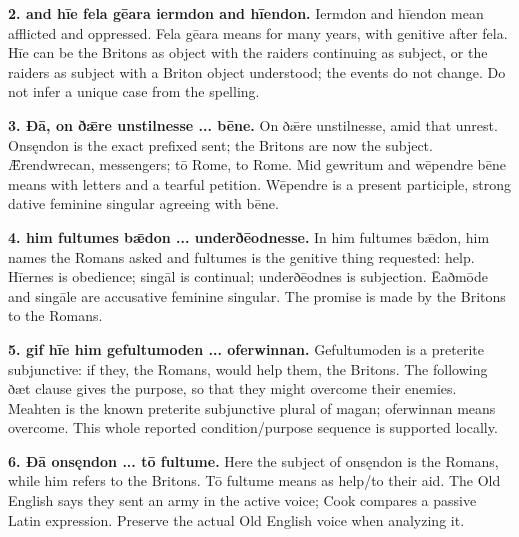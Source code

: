 \textbf{2. and hīe fela gēara iermdon and hīendon.} Iermdon and hīendon mean afflicted and oppressed. Fela gēara means for many years, with genitive after fela. Hīe can be the Britons as object with the raiders continuing as subject, or the raiders as subject with a Briton object understood; the events do not change. Do not infer a unique case from the spelling.

\textbf{3. Ðā, on ðǣre unstilnesse ... bēne.} On ðǣre unstilnesse, amid that unrest. Onsęndon is the exact prefixed sent; the Britons are now the subject. Ǣrendwrecan, messengers; tō Rome, to Rome. Mid gewritum and wēpendre bēne means with letters and a tearful petition. Wēpendre is a present participle, strong dative feminine singular agreeing with bēne.

\textbf{4. him fultumes bǣdon ... underðēodnesse.} In him fultumes bǣdon, him names the Romans asked and fultumes is the genitive thing requested: help. Hīernes is obedience; singāl is continual; underðēodnes is subjection. Ēaðmōde and singāle are accusative feminine singular. The promise is made by the Britons to the Romans.

\textbf{5. gif hīe him gefultumoden ... oferwinnan.} Gefultumoden is a preterite subjunctive: if they, the Romans, would help them, the Britons. The following ðæt clause gives the purpose, so that they might overcome their enemies. Meahten is the known preterite subjunctive plural of magan; oferwinnan means overcome. This whole reported condition/\allowbreak{}purpose sequence is supported locally.

\textbf{6. Ðā onsęndon ... tō fultume.} Here the subject of onsęndon is the Romans, while him refers to the Britons. Tō fultume means as help/\allowbreak{}to their aid. The Old English says they sent an army in the active voice; Cook compares a passive Latin expression. Preserve the actual Old English voice when analyzing it.

